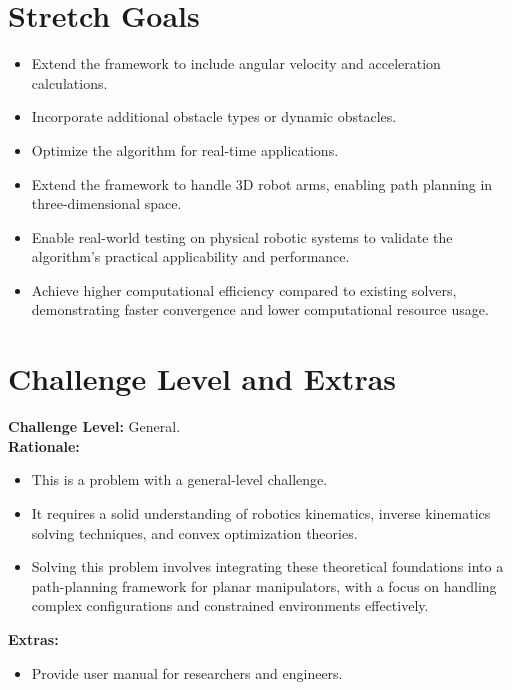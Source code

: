 \documentclass{article}
\begin{document}
\section{Stretch Goals}
\begin{itemize}
    \item Extend the framework to include angular velocity and acceleration calculations.
    \item Incorporate additional obstacle types or dynamic obstacles.
    \item Optimize the algorithm for real-time applications.
    \item Extend the framework to handle 3D robot arms, enabling path planning in three-dimensional space.
    \item Enable real-world testing on physical robotic systems to validate the algorithm’s practical applicability and performance.
    \item Achieve higher computational efficiency compared to existing solvers, demonstrating faster convergence and lower computational resource usage.
\end{itemize}


\section{Challenge Level and Extras}
\textbf{Challenge Level:} General.\\
\textbf{Rationale:}
\begin{itemize}
    \item This is a problem with a general-level challenge. 
    \item It requires a solid understanding of robotics kinematics, inverse kinematics solving techniques, and convex optimization theories. 
    \item Solving this problem involves integrating these theoretical foundations into a path-planning framework for planar manipulators, with a focus on handling complex configurations and constrained environments effectively.
\end{itemize}

\textbf{Extras:}
\begin{itemize}
    \item Provide user manual for researchers and engineers.
\end{itemize}
\end{document}
